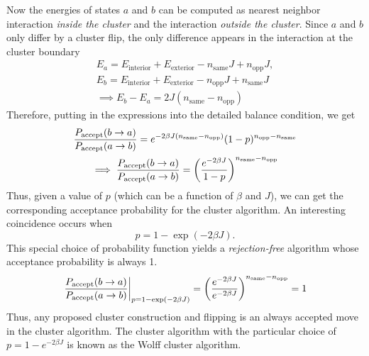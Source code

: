 \documentclass[../journal_main.tex]{subfiles}
\begin{document}
Now the energies of states $a$ and $b$ can be computed as nearest neighbor interaction \textit{inside the cluster} and the interaction \textit{outside the cluster}. Since $a$ and $b$ only differ by a cluster flip, the only difference appears in the interaction at the cluster boundary
\begin{subequations}
    \begin{gather}
        E_a = E_\text{interior} + E_\text{exterior} - n_\text{same}J + n_\text{opp} J, \\
        E_b = E_\text{interior} + E_\text{exterior} - n_\text{opp}J + n_\text{same} J \\ 
        \implies E_b - E_a = 2J(n_\text{same} - n_\text{opp})
    \end{gather}
\end{subequations}
Therefore, putting in the expressions into the detailed balance condition, we get
\begin{subequations}
    \begin{gather}
        \frac{P_\text{accept}(b \to a)}{P_\text{accept}(a \to b)} = e^{-2\beta J(n_\text{same} - n_\text{opp})} (1-p)^{n_\text{opp} - n_\text{same}} \\
        \implies \frac{P_\text{accept}(b \to a)}{P_\text{accept}(a \to b)} = \qty(\frac{e^{-2\beta J}}{1-p})^{n_\text{same} - n_\text{opp}}
    \end{gather}
\end{subequations}
Thus, given a value of $p$ (which can be a function of $\beta$ and $J$), we can get the corresponding acceptance probability for the cluster algorithm. An interesting coincidence occurs when 
\begin{equation}
    p = 1 - \exp(-2\beta J).
\end{equation}
This special choice of probability function yields a \textit{rejection-free} algorithm whose acceptance probability is always 1. 
\begin{equation}
    \eval{\frac{P_\text{accept}(b \to a)}{P_\text{accept}(a \to b)}}_{p = 1 - \exp(-2\beta J)} = \qty(\frac{e^{-2\beta J}}{e^{-2\beta J}})^{n_\text{same} - n_\text{opp}} = 1
\end{equation}
Thus, any proposed cluster construction and flipping is an always accepted move in the cluster algorithm. The cluster algorithm with the particular choice of $p = 1 - e^{-2\beta J}$ is known as the Wolff cluster algorithm. 
\end{document}
